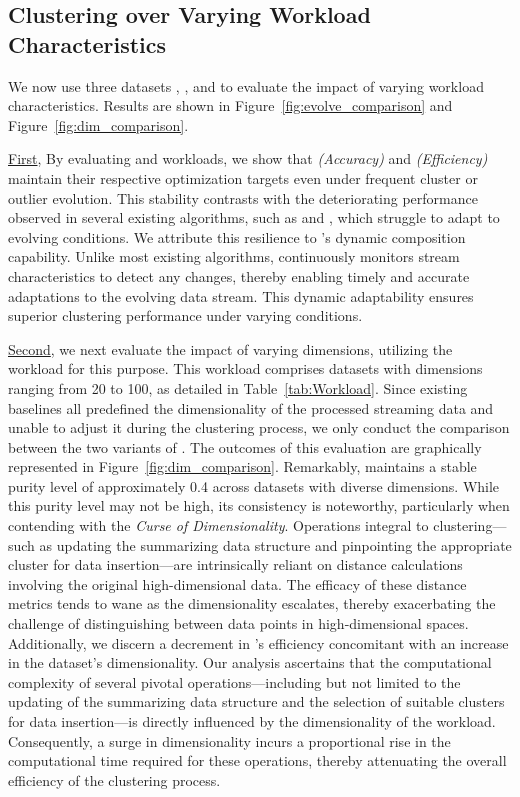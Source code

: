 \subsection{Clustering over Varying Workload Characteristics}
\label{subsec:dynamic_evaluation}
We now use three datasets \eds, \ods, and \dimension to evaluate the impact of varying workload characteristics.
Results are shown in Figure~\ref{fig:evolve_comparison} and Figure~\ref{fig:dim_comparison}.

\underline{First}, By evaluating \eds and \ods workloads, we show that \emph{\algo (Accuracy)} and \emph{\algo (Efficiency)} maintain their respective optimization targets even under frequent cluster or outlier evolution. This stability contrasts with the deteriorating performance observed in several existing \dsc algorithms, such as \clustream and \slkmeans, which struggle to adapt to evolving conditions. We attribute this resilience to \algo's dynamic composition capability. Unlike most existing algorithms, \algo continuously monitors stream characteristics to detect any changes, thereby enabling timely and accurate adaptations to the evolving data stream. This dynamic adaptability ensures superior clustering performance under varying conditions.

\underline{Second}, we next evaluate the impact of varying dimensions, utilizing the \dimension workload for this purpose. This workload comprises datasets with dimensions ranging from 20 to 100, as detailed in Table~\ref{tab:Workload}. Since existing baselines all predefined the dimensionality of the processed streaming data and unable to adjust it during the clustering process, we only conduct the comparison between the two variants of \algo. The outcomes of this evaluation are graphically represented in Figure~\ref{fig:dim_comparison}. Remarkably, \algo maintains a stable purity level of approximately 0.4 across datasets with diverse dimensions. While this purity level may not be high, its consistency is noteworthy, particularly when contending with the \emph{Curse of Dimensionality}. Operations integral to clustering—such as updating the summarizing data structure and pinpointing the appropriate cluster for data insertion—are intrinsically reliant on distance calculations involving the original high-dimensional data. The efficacy of these distance metrics tends to wane as the dimensionality escalates, thereby exacerbating the challenge of distinguishing between data points in high-dimensional spaces. Additionally, we discern a decrement in \algo's efficiency concomitant with an increase in the dataset's dimensionality. Our analysis ascertains that the computational complexity of several pivotal operations—including but not limited to the updating of the summarizing data structure and the selection of suitable clusters for data insertion—is directly influenced by the dimensionality of the workload. Consequently, a surge in dimensionality incurs a proportional rise in the computational time required for these operations, thereby attenuating the overall efficiency of the clustering process.



